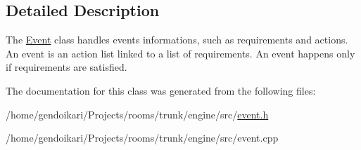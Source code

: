 \subsection{Detailed Description}
The \hyperlink{classEvent}{Event} class handles events informations, such as requirements and actions. An event is an action list linked to a list of requirements. An event happens only if requirements are satisfied. 

The documentation for this class was generated from the following files:\begin{DoxyCompactItemize}
\item 
/home/gendoikari/Projects/rooms/trunk/engine/src/\hyperlink{event_8h}{event.h}\item 
/home/gendoikari/Projects/rooms/trunk/engine/src/event.cpp\end{DoxyCompactItemize}

